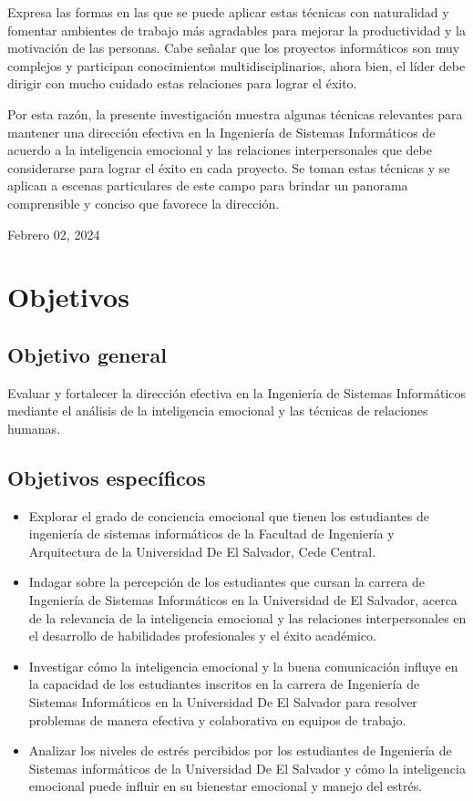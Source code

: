 \documentclass[journal]{IEEEtran}
\begin{document}
Expresa las formas en las que se puede aplicar estas técnicas con naturalidad y fomentar ambientes de trabajo más agradables para mejorar la productividad y la motivación de las personas. Cabe señalar que los proyectos informáticos son muy complejos y participan conocimientos multidisciplinarios, ahora bien, el líder debe dirigir con mucho cuidado estas relaciones para lograr el éxito.

Por esta razón, la presente investigación muestra algunas técnicas relevantes para mantener una dirección efectiva en la Ingeniería de Sistemas Informáticos de acuerdo a la inteligencia emocional y las relaciones interpersonales que debe considerarse para lograr el éxito en cada proyecto. Se toman estas técnicas y se aplican a escenas particulares de este campo para brindar un panorama comprensible y conciso que favorece la dirección.

\hfill Febrero 02, 2024

\section{Objetivos}

\subsection{Objetivo general}
Evaluar y fortalecer la dirección efectiva en la Ingeniería de Sistemas Informáticos mediante el análisis de la inteligencia emocional y las técnicas de relaciones humanas.

\subsection{Objetivos específicos}
\begin{itemize}
	\item Explorar el grado de conciencia emocional que tienen los estudiantes de ingeniería de sistemas informáticos de la Facultad de Ingeniería y Arquitectura de la Universidad De El Salvador, Cede Central.
	\item Indagar sobre la percepción de los estudiantes que cursan la carrera de Ingeniería de Sistemas Informáticos en la Universidad de El Salvador, acerca de la relevancia de la inteligencia emocional y las relaciones interpersonales en el desarrollo de habilidades profesionales y el éxito académico.
	\item Investigar cómo la inteligencia emocional y la buena comunicación influye en la capacidad de los estudiantes inscritos en la carrera de Ingeniería de Sistemas Informáticos en la Universidad De El Salvador para resolver problemas de manera efectiva y colaborativa en equipos de trabajo.
	\item Analizar los niveles de estrés percibidos por los estudiantes de Ingeniería de Sistemas informáticos de la Universidad De El Salvador y cómo la inteligencia emocional puede influir en su bienestar emocional y manejo del estrés.
\end{itemize}
\end{document}
